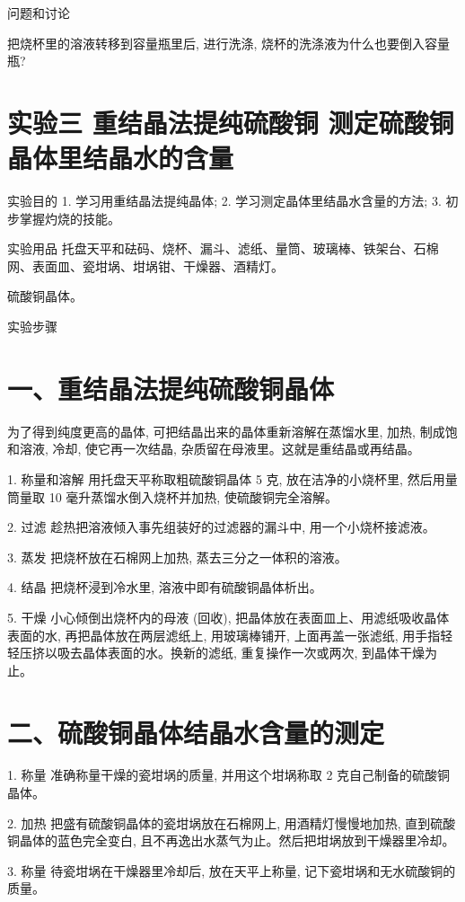 \documentclass[10pt]{article}
\begin{document}
问题和讨论

把烧杯里的溶液转移到容量瓶里后, 进行洗涤, 烧杯的洗涤液为什么也要倒入容量瓶?

\section*{实验三 重结晶法提纯硫酸铜 测定硫酸铜晶体里结晶水的含量}

实验目的 1. 学习用重结晶法提纯晶体; 2. 学习测定晶体里结晶水含量的方法; 3. 初步掌握灼烧的技能。

实验用品 托盘天平和砝码、烧杯、漏斗、滤纸、量筒、玻璃棒、铁架台、石棉网、表面皿、瓷坩埚、坩埚钳、干燥器、酒精灯。

硫酸铜晶体。

实验步骤

\section*{一、重结晶法提纯硫酸铜晶体}

为了得到纯度更高的晶体, 可把结晶出来的晶体重新溶解在蒸馏水里, 加热, 制成饱和溶液, 冷却, 使它再一次结晶, 杂质留在母液里。这就是重结晶或再结晶。

1. 称量和溶解 用托盘天平称取粗硫酸铜晶体 5 克, 放在洁净的小烧杯里, 然后用量筒量取 10 毫升蒸馏水倒入烧杯并加热, 使硫酸铜完全溶解。

2. 过滤 趁热把溶液倾入事先组装好的过滤器的漏斗中, 用一个小烧杯接滤液。

3. 蒸发 把烧杯放在石棉网上加热, 蒸去三分之一体积的溶液。

4. 结晶 把烧杯浸到冷水里, 溶液中即有硫酸铜晶体析出。

5. 干燥 小心倾倒出烧杯内的母液 (回收), 把晶体放在表面皿上、用滤纸吸收晶体表面的水, 再把晶体放在两层滤纸上, 用玻璃棒铺开, 上面再盖一张滤纸, 用手指轻轻压挤以吸去晶体表面的水。换新的滤纸, 重复操作一次或两次, 到晶体干燥为止。

\section*{二、硫酸铜晶体结晶水含量的测定}

1. 称量 准确称量干燥的瓷坩埚的质量, 并用这个坩埚称取 2 克自己制备的硫酸铜晶体。

2. 加热 把盛有硫酸铜晶体的瓷坩埚放在石棉网上, 用酒精灯慢慢地加热, 直到硫酸铜晶体的蓝色完全变白, 且不再逸出水蒸气为止。然后把坩埚放到干燥器里冷却。

3. 称量 待瓷坩埚在干燥器里冷却后, 放在天平上称量, 记下瓷坩埚和无水硫酸铜的质量。
\end{document}
